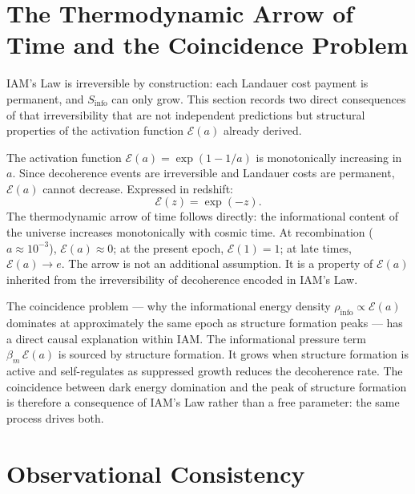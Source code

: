 \documentclass[12pt,a4paper]{article}
\begin{document}
\section{The Thermodynamic Arrow of Time and the Coincidence Problem}
\label{sec:arrow}

IAM's Law is irreversible by construction: each Landauer cost payment
is permanent, and $S_\mathrm{info}$ can only grow. This section
records two direct consequences of that irreversibility that are
not independent predictions but structural properties of the
activation function $\mathcal{E}(a)$ already derived.

The activation function $\mathcal{E}(a) = \exp(1-1/a)$ is
monotonically increasing in $a$. Since decoherence events are
irreversible and Landauer costs are permanent, $\mathcal{E}(a)$
cannot decrease. Expressed in redshift:
\begin{equation}
\mathcal{E}(z) = \exp(-z).
\label{eq:E_redshift}
\end{equation}
The thermodynamic arrow of time follows directly: the informational
content of the universe increases monotonically with cosmic time.
At recombination ($a \approx 10^{-3}$), $\mathcal{E}(a) \approx 0$;
at the present epoch, $\mathcal{E}(1) = 1$; at late times,
$\mathcal{E}(a) \to e$. The arrow is not an additional assumption.
It is a property of $\mathcal{E}(a)$ inherited from the
irreversibility of decoherence encoded in IAM's Law.

The coincidence problem --- why the informational energy density
$\rho_\mathrm{info} \propto \mathcal{E}(a)$ dominates at
approximately the same epoch as structure formation peaks --- has
a direct causal explanation within IAM. The informational pressure
term $\beta_m\,\mathcal{E}(a)$ is sourced by structure formation.
It grows when structure formation is active and self-regulates as
suppressed growth reduces the decoherence rate. The coincidence
between dark energy domination and the peak of structure formation
is therefore a consequence of IAM's Law rather than a free
parameter: the same process drives both.

\section{Observational Consistency}
\label{sec:obs}
\end{document}
